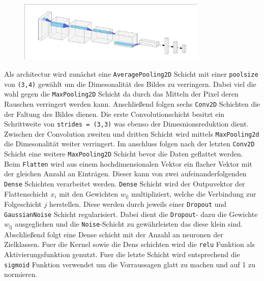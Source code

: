 \begin{figure}[h]
		\centering
		\includegraphics[width=0.8\textwidth]{pictures/architecture.pdf}
		\caption{}
		\label{fig:}
\end{figure}
Als architectur wird zunächst eine \texttt{AveragePooling2D} Schicht mit einer
\texttt{poolsize} von \texttt{(3,4)} gewählt um die Dimesonalität des Bildes zu verringern.
Dabei viel die wahl gegen die \texttt{MaxPooling2D} Schicht da durch das 
Mitteln der Pixel deren Rauschen verringert werden kann.
Anschließend folgen sechs \texttt{Conv2D} Schichten die der Faltung des Bildes
dienen. 
Die erste Convolutionschicht besitzt ein Schrittweite von \texttt{strides =
(3,3)} was ebenso der Dimesnionsreduktion dient.
Zwischen der Convolution zweiten und dritten Schicht wird mittels
\texttt{MaxPooling2d} die Dimesonalität weiter verringert. 
Im anschluss folgen nach der letzten \texttt{Conv2D} Schicht eine weitere
\texttt{MaxPooling2D} Schicht bevor die Daten geflattet werden.
Beim \texttt{Flatten} wird aus einem hochdimensionalen Vektor ein flacher Vektor
mit der gleichen Anzahl an Einträgen.
Dieser kann von zwei aufeinanderfolgenden \texttt{Dense} Schichten verarbeitet
werden.
\texttt{Dense} Schicht wird der Outpuvektor der Flattenschicht $x_i$ mit den
Gewichten $w_\text{ij}$ multipliziert, welche die Verbindung zur Folgeschicht
$j$ herstellen.
Diese werden durch jeweils einer \texttt{Dropout} und \texttt{GaussianNoise} 
Schicht regularisiert. 
Dabei dient die \texttt{Dropout}- dazu die Gewichte $w_\text{ij}$ ausgeglichen 
und die \texttt{Noise}-Schicht zu gewährleisten das diese klein sind.
Abschließend folgt eine Dense schicht mit der Anzahl an neuronen der
Zielklassen.
Fuer die Kernel sowie die Dens schichten wird die \texttt{relu} Funktion als
Aktivierungsfunktion genutzt.
Fuer die letzte Schicht wird entsprechend die \texttt{sigmoid} Funktion verwendet um die
Vorraussagen glatt zu machen und auf 1 zu normieren.
